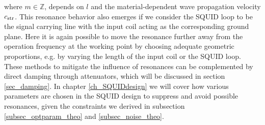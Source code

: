 
where $m\in\mathbb{Z}$, depends on $l$ and the material-dependent wave propagation velocity $c_{\rm str}$. This resonance behavior also emerges if we consider the SQUID loop to be the signal carrying line with the input coil acting as the corresponding ground plane.  Here it is again possible to move the resonance further away from the operation frequency at the working point by choosing adequate geometric proportions, e.g. by varying the length of the input coil or the SQUID loop. These methods to mitigate the influence of resonances can be complemented by direct damping through attenuators, which will be discussed in section \ref{sec_damping}. In chapter \ref{ch_SQUIDdesign} we will cover how various parameters are chosen in the SQUID design to suppress and avoid possible resonances, given the constraints we derived in subsection \ref{subsec_optparam_theo} and \ref{subsec_noise_theo}.